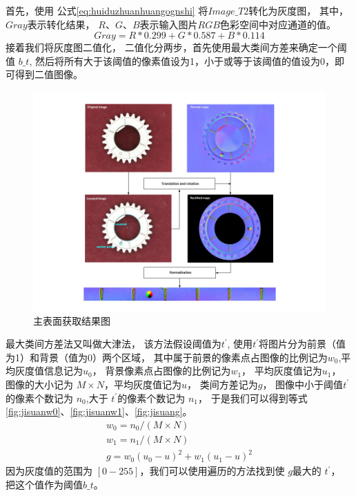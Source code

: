 首先，使用
公式\eqref{eq:huiduzhuanhuangognshi}
将$Image\_T 2$转化为灰度图，
其中，$Gray$表示转化结果，
$R$、$G$、$B$表示输入图片$RGB$色彩空间中对应通道的值。
\begin{equation}
\label{eq:huiduzhuanhuangognshi}
Gray=R*0.299+G*0.587+B*0.114
\end{equation}
接着我们将灰度图二值化，
二值化分两步，首先使用最大类间方差来确定一个阈值
$b\_t$,
然后将所有大于该阈值的像素值设为1，小于或等于该阈值的值设为0，即可得到二值图像。
\begin{figure}[htbp]
\centering
\includegraphics[width=1.0\linewidth]{figures/jiaozhengliuchengtu.png}
\caption{主表面获取结果图}
\label{fig:zhubiaomianhuoquliucheng}
\end{figure}

最大类间方差法又叫做大津法，
该方法假设阈值为${t}^{'}$,
使用${t}^{'}$将图片分为前景（值为1）和背景（值为0）两个区域，
其中属于前景的像素点占图像的比例记为${w}_{0}$,平均灰度值信息记为${u}_{0}$，
背景像素点占图像的比例记为${w}_{1}$，
平均灰度值记为${u}_{1}$，
图像的大小记为
$M\times N$，平均灰度值记为$u$，
类间方差记为$g$，
图像中小于阈值${t}^{'}$
的像素个数记为
${n}_{0}$,大于
${t}^{'}$的像素个数记为
${n}_{1}$，
于是我们可以得到等式\ref{fig:jisuanw0}、\ref{fig:jisuanw1}、\ref{fig:jisuang}。
\begin{gather}
{w}_{0}={n}_{0}/(M\times N) \label{fig:jisuanw0}\\
{w}_{1}={n}_{1}/(M\times N)\label{fig:jisuanw1}\\
g={w}_{0} {({u}_{0}-u)}^{2}+{w}_{1}{(u_1-u)}^{2} \label{fig:jisuang}
\end{gather}
因为灰度值的范围为
$[0-255]$，我们可以使用遍历的方法找到使
$g$最大的
${t}^{'}$，
把这个值作为阈值$b\_t$。

